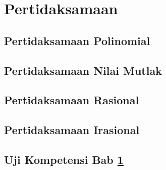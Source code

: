 \chapter{Pertidaksamaan}
\label{sec:third}
\kant[12-13] %
\section{Pertidaksamaan Polinomial}
\kant[14]    %
\section{Pertidaksamaan Nilai Mutlak}
\kant[15]    %
\section{Pertidaksamaan Rasional}
\kant[6]
\section{Pertidaksamaan Irasional}
\kant[7]

\section{Uji Kompetensi Bab \ref{sec:third}}
\kant[8]